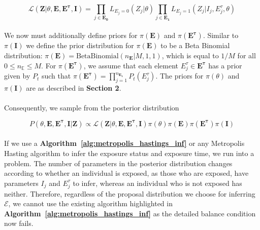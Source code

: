 \documentclass{article}
\begin{document}
\begin{equation}
\mathcal{L}(\mathbf{Z} | \theta, \mathbf{E}, \mathbf{E^\tau}, \mathbf{I}) = \prod_{j \in \mathbf{E_0}}L_{E_j = 0}(Z_{j}| \theta) \prod_{j \in \mathbf{E_1}}L_{E_j = 1}(Z_{j}| I_j, E_j^\tau, \theta) 
\end{equation}

\paragraph{}We now must additionally define priors for $\pi(\mathbf{E})$ and $\pi(\mathbf{E^{\tau}})$. Similar to $\pi(\mathbf{I})$ we define the prior distribution for  $\pi(\mathbf{E})$ to be a Beta Binomial distribution: $\pi(\mathbf{E}) = \text{BetaBinomial}(n_{\mathbf{E}}| M, 1, 1)$, which is equal to $1/M$ for all $0 \leq n_{\mathbb{E}} \leq M$. For $\pi(\mathbf{E^{\tau}})$, we assume that each element $E_j^\tau \in \mathbf{E^{\tau}}$ has a prior given by $P_t$ such that $\pi(\mathbf{E^{\tau}}) = \prod_{j = 1}^{n_\mathbf{E_1}} P_t(E_j^\tau)$. The priors for $\pi(\theta)$ and $\pi(\mathbf{I})$ are as described in \textbf{Section 2}. 

\paragraph{}Consequently, we sample from the posterior distribution

\begin{equation}
P(\theta, \mathbf{E}, \mathbf{E^\tau}, \mathbf{I} | \mathbf{Z}) \propto \mathcal{L}(\mathbf{Z} | \theta, \mathbf{E}, \mathbf{E^\tau}, \mathbf{I})\pi(\theta)\pi(\mathbf{E})\pi( \mathbf{E^\tau})\pi(\mathbf{I})
\end{equation}


\paragraph{}If we use a \textbf{Algorithm~\ref{alg:metropolis_hastings_inf}} or any Metropolis Hasting algorithm to infer the exposure status and exposure time, we run into a problem. The number of parameters in the posterior distribution changes according to whether an individual is exposed, as those who are exposed, have parameters $I_j$ and $E^\tau_j$ to infer, whereas an individual who is not exposed has neither. Therefore, regardless of the proposal distribution we choose for inferring $\mathcal{E}$, we cannot use the existing algorithm highlighted in \textbf{Algorithm~\ref{alg:metropolis_hastings_inf}} as the detailed balance condition now fails. 
\end{document}
